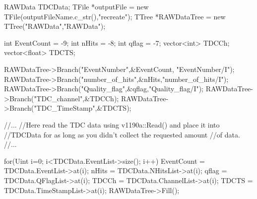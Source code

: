    \begin{code}
    \begin{cppcode}
RAWData TDCData;
TFile *outputFile = new TFile(outputFileName.c_str(),"recreate");
TTree *RAWDataTree = new TTree("RAWData","RAWData");

int           EventCount = -9;
int           nHits = -8;
int           qflag = -7;
vector<int>   TDCCh;
vector<float> TDCTS;

RAWDataTree->Branch("EventNumber",&EventCount, "EventNumber/I");
RAWDataTree->Branch("number_of_hits",&nHits,"number_of_hits/I");
RAWDataTree->Branch("Quality_flag",&qflag,"Quality_flag/I");
RAWDataTree->Branch("TDC_channel",&TDCCh);
RAWDataTree->Branch("TDC_TimeStamp",&TDCTS);

//...
//Here read the TDC data using v1190a::Read() and place it into
//TDCData for as long as you didn't collect the requested amount
//of data.
//...
    
for(Uint i=0; i<TDCData.EventList->size(); i++){
    EventCount  = TDCData.EventList->at(i);
    nHits       = TDCData.NHitsList->at(i);
    qflag       = TDCData.QFlagList->at(i);
    TDCCh       = TDCData.ChannelList->at(i);
    TDCTS       = TDCData.TimeStampList->at(i);
    RAWDataTree->Fill();
}
    \end{cppcode}
	\label{cpp:datatranfer}
    \vspace{5mm}
    \end{code}

